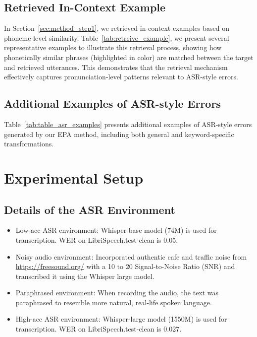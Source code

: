 
\subsection{Retrieved In-Context Example}
\label{app:EPA_retreive}
In Section~\ref{sec:method_step1}, we retrieved in-context examples based on phoneme-level similarity. Table~\ref{tab:retreive_example}, we present several representative examples to illustrate this retrieval process, showing how phonetically similar phrases (highlighted in color) are matched between the target and retrieved utterances. This demonstrates that the retrieval mechanism effectively captures pronunciation-level patterns relevant to ASR-style errors.


\subsection{Additional Examples of ASR-style Errors}

\label{app:asr-examples}

Table~\ref{tab:table_asr_examples} presents additional examples of ASR-style errors generated by our EPA method, including both general and keyword-specific transformations.



\section{Experimental Setup}
\label{app:exp_setting}
\subsection{Details of the ASR Environment}
\begin{itemize}
    \item Low-acc ASR environment: Whisper-base model (74M)\cite{whisper} is used for transcription. WER on LibriSpeech.test-clean is 0.05.
    \item Noisy audio environment: Incorporated authentic cafe and traffic noise from \url{https://freesound.org/} with a 10 to 20 Signal-to-Noise Ratio (SNR) and transcribed it using the Whisper large model.
    \item Paraphrased environment: When recording the audio, the text was paraphrased to resemble more natural, real-life spoken language\cite{dstc11}.
    \item High-acc ASR environment: Whisper-large model (1550M) is used for transcription. WER on LibriSpeech.test-clean is 0.027.
\end{itemize}




